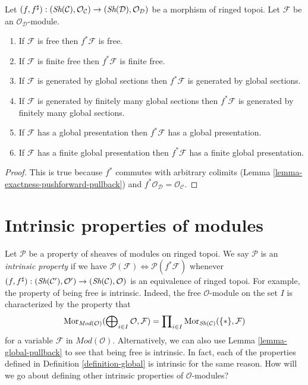 \begin{lemma}
\label{lemma-global-pullback}
Let
$(f, f^\sharp) :
(\mathop{\textit{Sh}}\nolimits(\mathcal{C}), \mathcal{O}_\mathcal{C})
\to
(\mathop{\textit{Sh}}\nolimits(\mathcal{D}), \mathcal{O}_\mathcal{D})$
be a morphism of ringed topoi.
Let $\mathcal{F}$ be an $\mathcal{O}_\mathcal{D}$-module.
\begin{enumerate}
\item If $\mathcal{F}$ is free then $f^*\mathcal{F}$ is free.
\item If $\mathcal{F}$ is finite free then $f^*\mathcal{F}$ is finite free.
\item If $\mathcal{F}$ is generated by global sections
then $f^*\mathcal{F}$ is generated by global sections.
\item If $\mathcal{F}$ is generated by finitely many global sections
then $f^*\mathcal{F}$ is generated by finitely many global sections.
\item If $\mathcal{F}$ has a global presentation then
$f^*\mathcal{F}$ has a global presentation.
\item If $\mathcal{F}$ has a finite global presentation
then $f^*\mathcal{F}$ has a finite global presentation.
\end{enumerate}
\end{lemma}

\begin{proof}
This is true because $f^*$ commutes with arbitrary colimits
(Lemma \ref{lemma-exactness-pushforward-pullback})
and $f^*\mathcal{O}_\mathcal{D} = \mathcal{O}_\mathcal{C}$.
\end{proof}






\section{Intrinsic properties of modules}
\label{section-intrinsic}

\noindent
Let $\mathcal{P}$ be a property of sheaves of modules on ringed topoi.
We say $\mathcal{P}$ is an {\it intrinsic property} if we have
$\mathcal{P}(\mathcal{F}) \Leftrightarrow \mathcal{P}(f^*\mathcal{F})$
whenever $(f, f^\sharp) :
(\mathop{\textit{Sh}}\nolimits(\mathcal{C}'), \mathcal{O}')
\to
(\mathop{\textit{Sh}}\nolimits(\mathcal{C}), \mathcal{O})$
is an equivalence of ringed topoi.
For example, the property of being free is intrinsic. Indeed, the free
$\mathcal{O}$-module on the set $I$ is characterized by the property
that
$$
\mathop{\rm Mor}\nolimits_{\textit{Mod}(\mathcal{O})}(
\bigoplus\nolimits_{i \in I} \mathcal{O},
\mathcal{F})
=
\prod\nolimits_{i \in I} \mathop{\rm Mor}\nolimits_{\mathop{\textit{Sh}}\nolimits(\mathcal{C})}(\{*\},
\mathcal{F})
$$
for a variable $\mathcal{F}$ in $\textit{Mod}(\mathcal{O})$.
Alternatively, we can also use Lemma \ref{lemma-global-pullback}
to see that being free is intrinsic. In fact, each of the properties
defined in Definition \ref{definition-global} is intrinsic for the
same reason.
How will we go about defining other intrinsic properties of
$\mathcal{O}$-modules?

